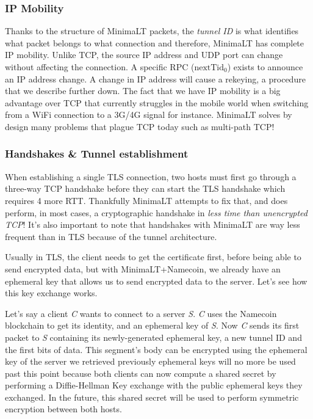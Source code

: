 \documentclass{vldb}
\begin{document}
\subsubsection{IP Mobility}

Thanks to the structure of MinimaLT packets, the \emph{tunnel ID} is what identifies what packet belongs to what connection and therefore, MinimaLT has complete IP mobility. Unlike TCP, the source IP address and UDP port can change without affecting the connection. A specific RPC (\emph{$\text{nextTid}_{0}$}) exists to announce an IP address change. A change in IP address will cause a rekeying, a procedure that we describe further down. The fact that we have IP mobility is a big advantage over TCP that currently struggles in the mobile world when switching from a WiFi connection to a 3G/4G signal for instance. MinimaLT solves by design many problems that plague TCP today such as multi-path TCP!

\subsubsection{Handshakes \& Tunnel establishment}

When establishing a single TLS connection, two hosts must first go through a three-way TCP  handshake before they can start the TLS handshake which requires 4 more RTT. Thankfully MinimaLT attempts to fix that, and does perform, in most cases, a cryptographic handshake in \emph{less time than unencrypted TCP}! It's also important to note that handshakes with MinimaLT are way less frequent than in TLS because of the tunnel architecture.

Usually in TLS, the client needs to get the certificate first, before being able to send encrypted data, but with MinimaLT+Namecoin, we already have an ephemeral key that allows us to send encrypted data to the server. Let's see how this key exchange works.

Let's say a client \emph{C} wants to connect to a server \emph{S}. \emph{C} uses the Namecoin blockchain to get its identity, and an ephemeral key of \emph{S}. Now \emph{C} sends its first packet to \emph{S} containing its newly-generated ephemeral key, a new tunnel ID and the first bits of data. This segment's body can be encrypted using the ephemeral key of the server we retrieved previously ephemeral keys will no more be used past this point because both clients can now compute a shared secret by performing a Diffie-Hellman Key exchange with the public ephemeral keys they exchanged. In the future, this shared secret will be used to perform symmetric encryption between both hosts.
\end{document}
